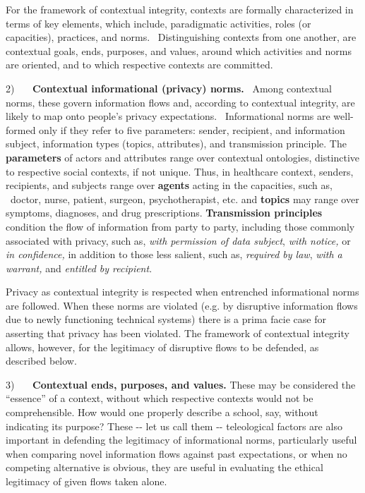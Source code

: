 \documentclass[../thesis.tex]{subfiles}
\begin{document}
\bigskip

For the framework of contextual integrity, contexts are formally
characterized in terms of key elements, which include, paradigmatic
activities, roles (or capacities), practices, and norms.
\ Distinguishing contexts from one another, are contextual goals, ends,
purposes, and values, around which activities and norms are oriented,
and to which respective contexts are committed.


\bigskip

2) \ \ \ \textbf{Contextual informational (privacy) norms.} \ Among
contextual norms, these govern information flows and, according to
contextual integrity, are likely to map onto people's
privacy expectations. \ Informational norms are well-formed only if
they refer to five parameters: sender, recipient, and information
subject, information types (topics, attributes), and transmission
principle. The \textbf{parameters} of actors and attributes range over
contextual ontologies, distinctive to respective social contexts, if
not unique. Thus, in healthcare context, senders, recipients, and
subjects range over \textbf{agents} acting in the capacities, such as,
\ doctor, nurse, patient, surgeon, psychotherapist, etc. and
\textbf{topics} may range over symptoms, diagnoses, and drug
prescriptions. \textbf{Transmission principles} condition the flow of
information from party to party, including those commonly associated
with privacy, such as, \textit{with permission of data subject},
\textit{with notice,} or \textit{in confidence, }in addition to those
less salient, such as, \textit{required by law}, \textit{with a
warrant,} and \textit{entitled by recipient}.


\bigskip

Privacy as contextual integrity is respected when entrenched
informational norms are followed. When these norms are violated (e.g.
by disruptive information flows due to newly functioning technical
systems) there is a prima facie case for asserting that privacy has
been violated. The framework of contextual integrity allows, however,
for the legitimacy of disruptive flows to be defended, as described
below. 


\bigskip

3) \ \ \ \textbf{Contextual ends, purposes, and values.} These may be
considered the ``essence'' of a
context, without which respective contexts would not be comprehensible.
How would one properly describe a school, say, without indicating its
purpose? These -{}- let us call them -{}- teleological factors are also
important in defending the legitimacy of informational norms,
particularly useful when comparing novel information flows against past
expectations, or when no competing alternative is obvious, they are
useful in evaluating the ethical legitimacy of given flows taken alone.
\end{document}
